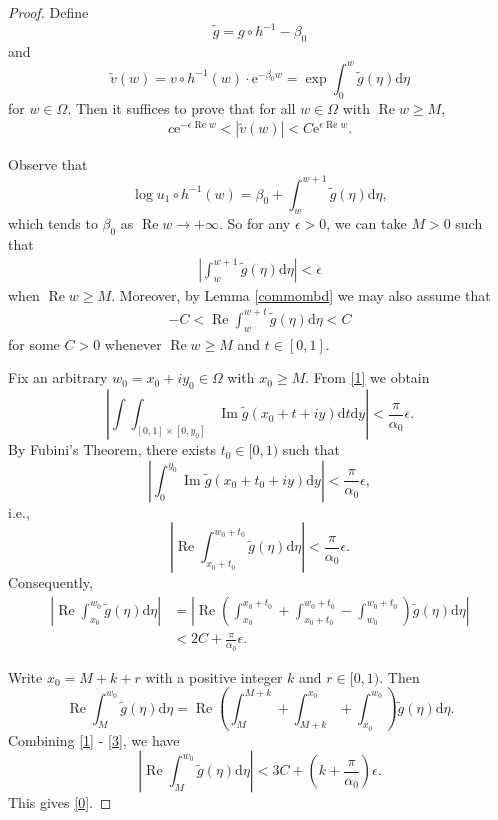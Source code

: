 \documentclass{amsart}
\theoremstyle{proclaim}
\theoremstyle{fancyproclaim}
\theoremstyle{definition}
\theoremstyle{fancystatement}
\numberwithin{equation}{section}
\begin{document}
\begin{proof}
Define
$$\tilde{g}=g\circ h^{-1}-\beta_0$$
and
$$\tilde{v}(w) = v \circ h^{-1}(w) \cdot \mathrm{e}^{-\beta_0w} = \exp\int_0^w\tilde{g}(\eta) \mathrm{d}\eta$$
for $w\in\Omega$. Then it suffices to prove that for all $w\in\Omega$ with $\operatorname{Re}w\geq M$,
\begin{align}\label{0}
c \mathrm{e}^{-\epsilon \operatorname{Re}w}<|\tilde{v}(w)|<C \mathrm{e}^{\epsilon \operatorname{Re}w}.
\end{align}

Observe that
$$\log u_1\circ h^{-1}(w)=\beta_0+\int_w^{w+1}\tilde{g}(\eta) \mathrm{d}\eta,$$
which tends to $\beta_0$ as $ \operatorname{Re}w\to+\infty$. So for any $\epsilon>0$, we can take $M>0$ such that
\begin{align}\label{1}
\left|\int_w^{w+1}\tilde{g}(\eta) \mathrm{d}\eta\right|<\epsilon
\end{align}
when $ \operatorname{Re}w\geq M$. Moreover, by Lemma \ref{commombd} we may also assume that
\begin{align}\label{2}
-C< \operatorname{Re}\int_w^{w+t}\tilde{g}(\eta) \mathrm{d}\eta<C
\end{align}
for some $C>0$ whenever $\operatorname{Re}w\geq M$ and $t\in[0,1]$.

Fix an arbitrary $w_0=x_0+iy_0\in \Omega$ with $x_0\geq M$. From \eqref{1} we obtain
$$\left|\int\int_{[0,1]\times[0,y_0]} \operatorname{Im}\tilde{g}(x_0+t+iy) \mathrm{d}t \mathrm{d}y\right|<\frac{\pi}{\alpha_0}\epsilon.$$
By Fubini's Theorem, there exists $t_0\in[0,1)$ such that
$$\left|\int_0^{y_0} \operatorname{Im}\tilde{g}(x_0+t_0+iy) \mathrm{d}y\right|<\frac{\pi}{\alpha_0}\epsilon,$$
i.e.,
$$\left| \operatorname{Re}\int_{x_0+t_0}^{w_0+t_0}\tilde{g}(\eta) \mathrm{d}\eta\right|<\frac{\pi}{\alpha_0}\epsilon.$$
Consequently,
\begin{align}\label{3}
\left| \operatorname{Re}\int_{x_0}^{w_0}\tilde{g}(\eta) \mathrm{d}\eta\right|&=\left| \operatorname{Re}\left(\int_{x_0}^{x_0+t_0}+\int_{x_0+t_0}^{w_0+t_0}-\int_{w_0}^{w_0+t_0}\right)\tilde{g}(\eta) \mathrm{d}\eta\right|\nonumber\\
&<2C+\frac{\pi}{\alpha_0}\epsilon.
\end{align}

Write $x_0=M+k+r$ with a positive integer $k$ and $r\in[0,1)$. Then
$$ \operatorname{Re}\int_M^{w_0}\tilde{g}(\eta) \mathrm{d}\eta= \operatorname{Re}\left(\int_M^{M+k}+\int_{M+k}^{x_0}+\int_{x_0}^{w_0}\right)\tilde{g}(\eta) \mathrm{d}\eta.$$
Combining \eqref{1} - \eqref{3}, we have
$$\left| \operatorname{Re}\int_M^{w_0}\tilde{g}(\eta) \mathrm{d}\eta\right|<3C+(k+\frac{\pi}{\alpha_0})\epsilon.$$
This gives \eqref{0}.
\end{proof}
\end{document}
